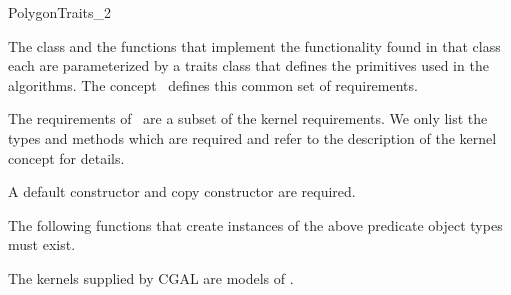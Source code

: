 

\begin{ccRefConcept}{PolygonTraits_2}


\ccDefinition

The  class and the functions that implement the functionality
found in that class each are parameterized by a traits class that defines the
primitives used in the algorithms.
The concept \ccRefName\ defines this common set of requirements.

The requirements of \ccRefName\ are a subset of the kernel requirements.
We only list the types and methods which are required and refer to the
description of the kernel concept for details.

\ccTypes


\ccCreation
{}  

A default constructor and copy constructor are required.

\ccOperations

The following functions that create instances of the above predicate object
types must exist.










\ccHasModels

The kernels supplied by CGAL are models of \ccRefName.

\ccSeeAlso


\end{ccRefConcept}


